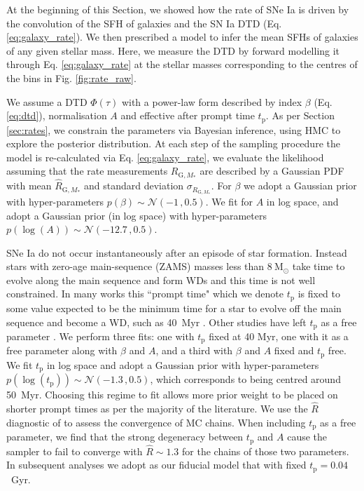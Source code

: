 \documentclass[fleqn,usenatbib]{mnras}
\begin{document}
At the beginning of this Section, we showed how the rate of SNe Ia is driven by the convolution of the SFH of galaxies and the SN Ia DTD (Eq. \ref{eq:galaxy_rate}). We then prescribed a model to infer the mean SFHs of galaxies of any given stellar mass. Here, we measure the DTD by forward modelling it through Eq. \ref{eq:galaxy_rate} at the stellar masses corresponding to the centres of the bins in Fig. \ref{fig:rate_raw}. 

We assume a DTD $\Phi(\tau)$ with a power-law form described by index $\beta$ (Eq. \ref{eq:dtd}), normalisation $A$ and effective after prompt time $t_{\mathrm{p}}$. As per Section \ref{sec:rates}, we constrain the parameters via Bayesian inference, using HMC to explore the posterior distribution. At each step of the sampling procedure the model is re-calculated via Eq. \ref{eq:galaxy_rate}, we evaluate the likelihood assuming that the rate measurements $R_{\mathrm{G}, M_*}$ are described by a Gaussian PDF with mean $\hat R_{\mathrm{G}, M_*}$ and standard deviation $\sigma_{R_{\mathrm{G}, M_*}}$. For $\beta$ we adopt a Gaussian prior with hyper-parameters $p(\beta) \sim \mathcal{N}(-1\,,0.5)$. We fit for $A$ in log space, and adopt a Gaussian prior (in log space) with hyper-parameters $p(\log(A)) \sim \mathcal{N}(-12.7\,, 0.5)$.

SNe Ia do not occur instantaneously after an episode of star formation. Instead stars with zero-age main-sequence (ZAMS) masses less than $8~\mathrm{M}_{\odot}$ take time to evolve along the main sequence and form WDs and this time is not well constrained. In many works this ``prompt time" which we denote $t_{\mathrm{p}}$ is fixed to some value expected to be the minimum time for a star to evolve off the main sequence and become a WD, such as 40~Myr \citep{Maoz2012,Graur2013,Graur2014}. Other studies have left $t_{\mathrm{p}}$ as a free parameter \citep{Heringer2019,Castrillo2020}. We perform three fits: one with $t_{\mathrm{p}}$ fixed at 40 Myr, one with it as a free parameter along with $\beta$ and $A$, and a third with $\beta$ and $A$ fixed and  $t_{\mathrm{p}}$ free. We fit $t_{\mathrm{p}}$ in log space and adopt a Gaussian prior with hyper-parameters $p(\log(t_{\mathrm{p}})) \sim \mathcal{N}(-1.3\,,0.5)$, which corresponds to being centred around 50~Myr. Choosing this regime to fit allows more prior weight to be placed on shorter prompt times as per the majority of the literature. We use the $\hat{R}$ diagnostic of \citet{Vehtari2019} to assess the convergence of MC chains. When including $t_{\mathrm{p}}$ as a free parameter, we find that the strong degeneracy between $t_{\mathrm{p}}$ and $A$ cause the sampler to fail to converge with $\hat{R} \sim 1.3$ for the chains of those two parameters. In subsequent analyses we adopt as our fiducial model that with fixed $t_{\mathrm{p}} =0.04$~Gyr.
\end{document}
